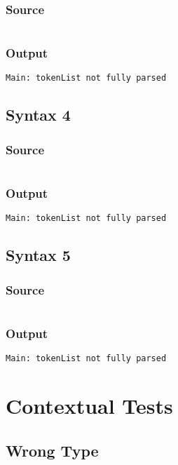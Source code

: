 \documentclass[twoside]{report}
\begin{document}
\subsection{Source}
\inputminted[tabsize=4,linenos,firstnumber=1]{text}{../test/syntax3.shl}
\subsection{Output}
\begin{verbatim}
Main: tokenList not fully parsed
\end{verbatim}

\section{Syntax 4}
\subsection{Source}
\inputminted[tabsize=4,linenos,firstnumber=1]{text}{../test/syntax4.shl}
\subsection{Output}
\begin{verbatim}
Main: tokenList not fully parsed
\end{verbatim}

\section{Syntax 5}
\subsection{Source}
\inputminted[tabsize=4,linenos,firstnumber=1]{text}{../test/syntax5.shl}
\subsection{Output}
\begin{verbatim}
Main: tokenList not fully parsed
\end{verbatim}


\chapter{Contextual Tests}

\section{Wrong Type}
\end{document}
